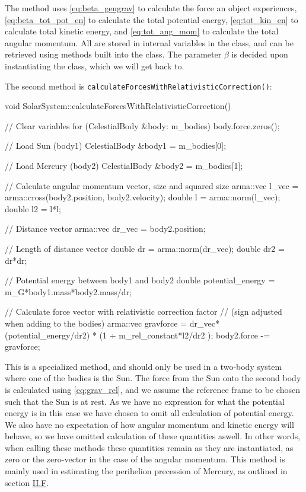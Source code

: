 \documentclass[reprint,english,notitlepage]{revtex4-1}  %
\begin{document}
The method uses \eqref{eq:beta_gengrav} to calculate the force an object experiences, \eqref{eq:beta_tot_pot_en} to calculate the total potential energy, \eqref{eq:tot_kin_en} to calculate total kinetic energy, and \eqref{eq:tot_ang_mom} to calculate the total angular momentum. All are stored in internal variables in the class, and can be retrieved using methods built into the class. The parameter $\beta$ is decided upon instantiating the class, which we will get back to. 

The second method is \verb+calculateForcesWithRelativisticCorrection()+:

\begin{cpp}
void SolarSystem::calculateForcesWithRelativisticCorrection() {
  // Clear variables
  for (CelestialBody &body: m_bodies) {
    body.force.zeros();
  }

  // Load Sun (body1)
  CelestialBody &body1 = m_bodies[0];

  // Load Mercury (body2)
  CelestialBody &body2 = m_bodies[1];

  // Calculate angular momentum vector, size and squared size
  arma::vec l_vec = arma::cross(body2.position, body2.velocity);
  double l = arma::norm(l_vec);
  double l2 = l*l;


  // Distance vector
  arma::vec dr_vec = body2.position;

  // Length of distance vector
  double dr = arma::norm(dr_vec);
  double dr2 = dr*dr;

  // Potential energy between body1 and body2
  double potential_energy = m_G*body1.mass*body2.mass/dr;

  // Calculate force vector with relativistic correction factor
  // (sign adjusted when adding to the bodies)
  arma::vec gravforce = dr_vec*(potential_energy/dr2)
  					    * (1 + m_rel_constant*l2/dr2 );
  body2.force -= gravforce;
}
\end{cpp}

This is a specialized method, and should only be used in a two-body system where one of the bodies is the Sun. The force from the Sun onto the second body is calculated using \eqref{eq:grav_rel}, and we assume the reference frame to be chosen such that the Sun is at rest. As we have no expression for what the potential energy is in this case we have chosen to omit all calculation of potential energy. We also have no expectation of how angular momentum and kinetic energy will behave, so we have omitted calculation of these quantities aswell. In other words, when calling these methods these quantities remain as they are instantiated, as zero or the zero-vector in the case of the angular momentum. This method is mainly used in estimating the perihelion precession of Mercury, as outlined in section \hyperref[sec:II:f]{II.F}.
\end{document}

